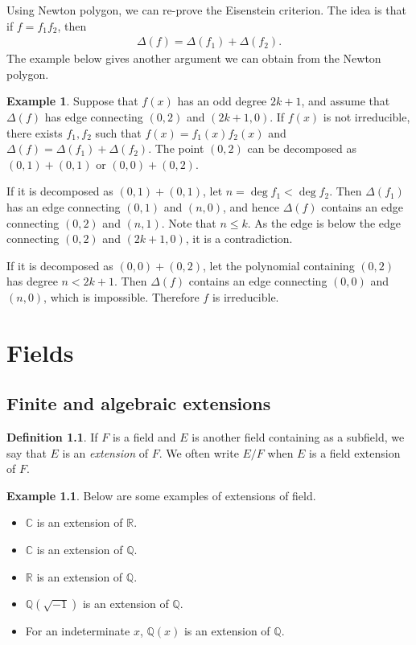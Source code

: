 \documentclass[12pt]{report}
\theoremstyle{plain}
\theoremstyle{remark}
\theoremstyle{definition}
\newtheorem{definition}[theorem]{Definition}
\newtheorem{example}[theorem]{Example}
\newcommand{\Q}{\mathbb{Q}}
\newcommand{\R}{\mathbb{R}}
\newcommand{\C}{\mathbb{C}}
\begin{document}
Using Newton polygon, we can re-prove the Eisenstein criterion. The idea is that if $f=f_1f_2$, then
\begin{align*}
    \Delta(f) = \Delta(f_1)+\Delta(f_2).
\end{align*}
The example below gives another argument we can obtain from the Newton polygon.

\begin{example}
    Suppose that $f(x)$ has an odd degree $2k+1$, and assume that $\Delta (f)$ has edge connecting $(0,2)$ and $(2k+1,0)$. If $f(x)$ is not irreducible, there exists $f_1,f_2$ such that $f(x)=f_1(x)f_2(x)$ and $\Delta (f) = \Delta(f_1) + \Delta(f_2)$. The point $(0,2)$ can be decomposed as $(0,1)+(0,1)$ or $(0,0)+(0,2)$.
    
    If it is decomposed as $(0,1)+(0,1)$, let $n = \deg f_1 < \deg f_2$. Then $\Delta(f_1)$ has an edge connecting $(0,1)$ and $(n,0)$, and hence $\Delta(f)$ contains an edge connecting $(0,2)$ and $(n,1)$. Note that $n\le k$. As the edge is below the edge connecting $(0,2)$ and $(2k+1,0)$, it is a contradiction.

    If it is decomposed as $(0,0)+(0,2)$, let the polynomial containing $(0,2)$ has degree $n<2k+1$. Then $\Delta(f)$ contains an edge connecting $(0,0)$ and $(n,0)$, which is impossible. Therefore $f$ is irreducible.
\end{example}


\chapter{Fields}

\section{Finite and algebraic extensions}

\begin{definition}
    If $F$ is a field and $E$ is another field containing as a subfield, we say that $E$ is an \emph{extension} of $F$. We often write $E/F$ when $E$ is a field extension of $F$.
\end{definition}

\begin{example}\label{Example 3.1.2.}
    Below are some examples of extensions of field.
    \begin{itemize}
        \item $\C$ is an extension of $\R$.
        \item $\C$ is an extension of $\Q$.
        \item $\R$ is an extension of $\Q$.
        \item $\Q(\sqrt{-1})$ is an extension of $\Q$.
        \item For an indeterminate $x$, $\Q(x)$ is an extension of $\Q$.
    \end{itemize}
\end{example}
\end{document}
